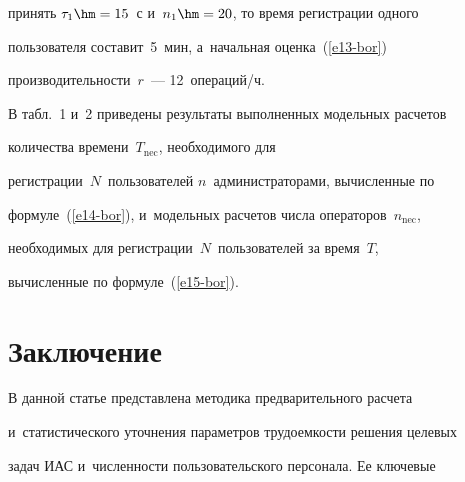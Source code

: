 принять $\tau_1\hm =15$~с и~$n_1\hm=20$, то время регистрации одного 


пользователя составит~5~мин, а~начальная оценка~(\ref{e13-bor}) 


производительности~$r$~--- 12~операций/ч.


      


      В табл.~1 и~2 приведены результаты выполненных модельных расчетов 


количества времени~$T_{\mathrm{nec}}$, необходимого для 


регистрации~$N$~пользователей $n$~администраторами, вычисленные по 


формуле~(\ref{e14-bor}), и~модельных расчетов числа операторов~$n_{\mathrm{nec}}$, 


необходимых для регистрации~$N$~пользователей за время~$T$, 


вычисленные по формуле~(\ref{e15-bor}).











      








\renewcommand{\figurename}{\protect\bf Рис.}


\renewcommand{\tablename}{\protect\bf Таблица}





\vspace*{-4pt}





\section{Заключение}





\vspace*{-2pt}





      В данной статье представлена методика предварительного расчета 


и~статистического уточнения параметров трудоемкости решения целевых 


задач ИАС и~численности пользовательского персонала. Ее ключевые 


